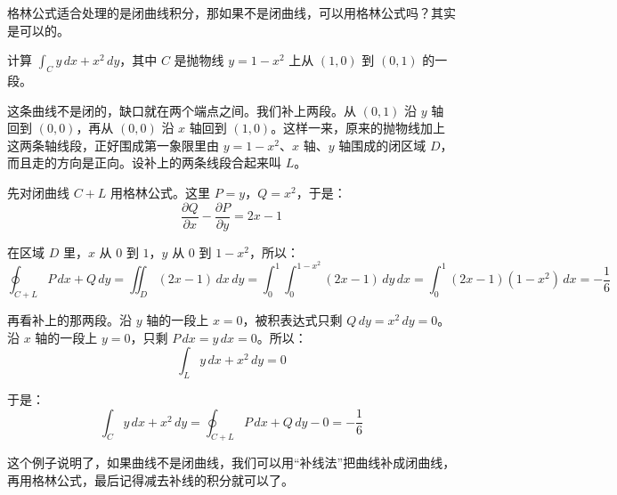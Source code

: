 格林公式适合处理的是闭曲线积分，那如果不是闭曲线，可以用格林公式吗？其实是可以的。

\begin{myexample}
    计算 \(\int_C y\,dx + x^2\,dy\)，其中 \(C\) 是抛物线 \(y=1-x^2\) 上从 \((1,0)\) 到 \((0,1)\) 的一段。

    这条曲线不是闭的，缺口就在两个端点之间。我们补上两段。从 \((0,1)\) 沿 \(y\) 轴回到 \((0,0)\)，再从 \((0,0)\) 沿 \(x\) 轴回到 \((1,0)\)。这样一来，原来的抛物线加上这两条轴线段，正好围成第一象限里由 \(y=1-x^2\)、\(x\) 轴、\(y\) 轴围成的闭区域 \(D\)，而且走的方向是正向。设补上的两条线段合起来叫 \(L\)。

    先对闭曲线 \(C+L\) 用格林公式。这里 \(P=y\)，\(Q=x^2\)，于是：
    \[
    \frac{\partial Q}{\partial x}-\frac{\partial P}{\partial y} = 2x-1
    \]

    在区域 \(D\) 里，\(x\) 从 \(0\) 到 \(1\)，\(y\) 从 \(0\) 到 \(1-x^2\)，所以：
    \[
    \oint_{C+L} P\,dx+Q\,dy = \iint_D (2x-1)\,dx\,dy = \int_0^1\int_0^{1-x^2} (2x-1)\,dy\,dx = \int_0^1 (2x-1)(1-x^2)\,dx = -\frac16
    \]

    再看补上的那两段。沿 \(y\) 轴的一段上 \(x=0\)，被积表达式只剩 \(Q\,dy=x^2\,dy=0\)。沿 \(x\) 轴的一段上 \(y=0\)，只剩 \(P\,dx=y\,dx=0\)。所以：
    \[
    \int_L y\,dx + x^2\,dy = 0
    \]

    于是：
    \[
    \int_C y\,dx + x^2\,dy = \oint_{C+L} P\,dx+Q\,dy - 0 = -\frac16
    \]
\end{myexample}

这个例子说明了，如果曲线不是闭曲线，我们可以用“补线法”把曲线补成闭曲线，再用格林公式，最后记得减去补线的积分就可以了。

